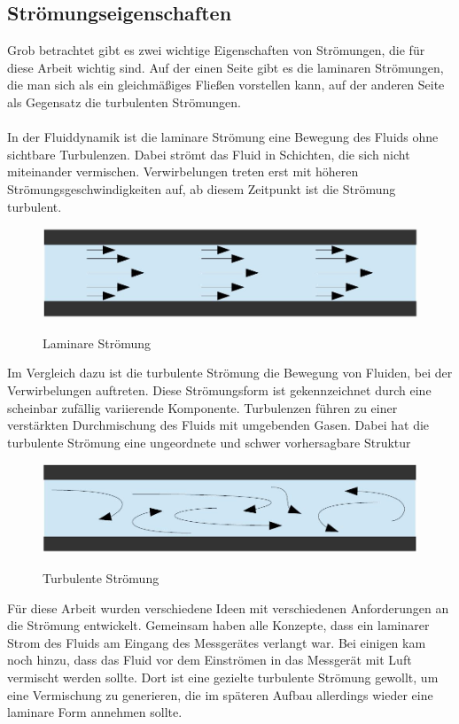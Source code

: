 \subsection{Str\"{o}mungseigenschaften}
Grob betrachtet gibt es zwei wichtige Eigenschaften von Str\"{o}mungen, die f\"{u}r diese Arbeit wichtig sind. Auf der einen Seite gibt es die laminaren Str\"{o}mungen, die man sich als ein gleichm\"{a}{\ss}iges Flie{\ss}en vorstellen kann, auf der anderen Seite als Gegensatz die turbulenten Str\"{o}mungen.
\\\\
In der Fluiddynamik ist die laminare Str\"{o}mung eine Bewegung des Fluids ohne sichtbare Turbulenzen. Dabei str\"{o}mt das Fluid in Schichten, die sich nicht miteinander vermischen. Verwirbelungen treten erst mit h\"{o}heren Str\"{o}mungsgeschwindigkeiten auf, ab diesem Zeitpunkt ist die Str\"{o}mung turbulent.
\begin{figure}[H]
        \myfloatalign
        {\includegraphics[width=.9\linewidth]{gfx/fundamentals/laminar.jpg}} \quad
        \caption[Laminare Str\"{o}mung]
        {Laminare Str\"{o}mung}
        \label{fig:laminar}
\end{figure}
Im Vergleich dazu ist die turbulente Str\"{o}mung die Bewegung von Fluiden, bei der Verwirbelungen auftreten. Diese Str\"{o}mungsform ist gekennzeichnet durch eine scheinbar zuf\"{a}llig variierende Komponente. Turbulenzen f\"{u}hren zu einer verst\"{a}rkten Durchmischung des Fluids mit umgebenden Gasen. Dabei hat die turbulente Str\"{o}mung eine ungeordnete und schwer vorhersagbare Struktur
\begin{figure}[H]
        \myfloatalign
        {\includegraphics[width=.9\linewidth]{gfx/fundamentals/turbulent.jpg}} \quad
        \caption[Turbulente Str\"{o}mung]
        {Turbulente Str\"{o}mung}
        \label{fig:turbulent}
\end{figure}
F\"{u}r diese Arbeit wurden verschiedene Ideen mit verschiedenen Anforderungen an die Str\"{o}mung entwickelt. Gemeinsam haben alle Konzepte, dass ein laminarer Strom des Fluids am Eingang des Messger\"{a}tes verlangt war. Bei einigen kam noch hinzu, dass das Fluid vor dem Einstr\"{o}men in das Messger\"{a}t mit Luft vermischt werden sollte. Dort ist eine gezielte turbulente Str\"{o}mung gewollt, um eine Vermischung zu generieren, die im sp\"{a}teren Aufbau allerdings wieder eine laminare Form annehmen sollte\cite{stream}.

